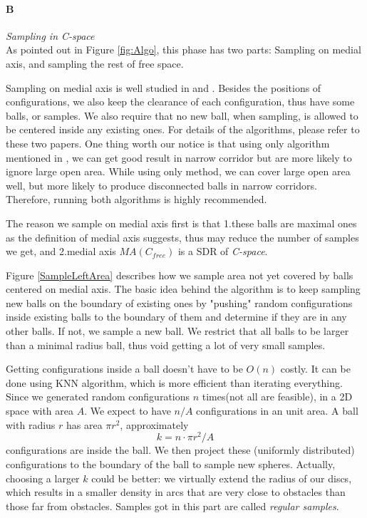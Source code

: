 \documentclass[11pt]{article}
\begin{document}
\paragraph{B} \emph{Sampling in C-space} \hfill \\
\indent As pointed out in Figure \ref{fig:Algo}, this phase has two parts: Sampling on medial axis, and sampling the rest of free space. 

\indent Sampling on medial axis is well studied in \cite{MAPRM} and \cite{UMAPRM}. Besides the positions of configurations, we also keep the clearance of each configuration, thus have some balls, or samples. We also require that no new ball, when sampling, is allowed to be centered inside any existing ones. For details of the algorithms, please refer to these two papers. One thing worth our notice is that using only algorithm mentioned in \cite{MAPRM}, we can get good result in narrow corridor but are more likely to ignore large open area. While using only \cite{UMAPRM} method, we can cover large open area well, but more likely to produce disconnected balls in narrow corridors. Therefore, running both algorithms is highly recommended. 

\indent The reason we sample on medial axis first is that 1.these balls are maximal ones as the definition of medial axis suggests, thus may reduce the number of samples we get, and 2.medial axis $MA(C_{free})$ is a SDR of \emph{C-space}. \cite{MAPRM2}

\indent Figure \ref{SampleLeftArea} describes how we sample area not yet covered by balls centered on medial axis. The basic idea behind the algorithm is to keep sampling new balls on the boundary of existing ones by "pushing" random configurations inside existing balls to the boundary of them and determine if they are in any other balls. If not, we sample a new ball. We restrict that all balls to be larger than a minimal radius ball, thus void getting a lot of very small samples.

\indent Getting configurations inside a ball doesn't have to be $O(n)$ costly. It can be done using KNN algorithm, which is more efficient than iterating everything. Since we generated random configurations $n$ times(not all are feasible), in a 2D space with area $A$. We expect to have $n/A$ configurations in an unit area. A ball with radius $r$ has area $\pi r^2$, approximately
\begin{equation}
k = n \cdot \pi r^2 / A
\end{equation} 
configurations are inside the ball. We then project these (uniformly distributed) configurations to the boundary of the ball to sample new spheres. Actually, choosing a larger $k$ could be better: we virtually extend the radius of our discs, which results in a smaller density in arcs that are very close to obstacles than those far from obstacles. Samples got in this part are called \emph{regular samples}. 
\end{document}

